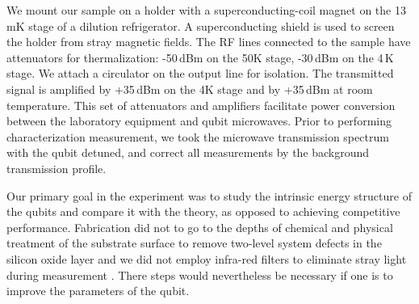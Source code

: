 


We mount our sample on a holder with a superconducting-coil magnet on the 13\,mK
stage of  a dilution refrigerator.  A  superconducting shield is used  to screen
the holder  from stray magnetic  fields.  The RF  lines connected to  the sample
have attenuators for thermalization: -50\,dBm on  the 50K stage, -30\,dBm on the
4\,K  stage.  We  attach a  circulator on  the output  line for  isolation.  The
transmitted signal is amplified  by +35\,dBm on the 4K stage  and by +35\,dBm at
room  temperature.  This  set  of attenuators  and  amplifiers facilitate  power
conversion  between the  laboratory equipment  and qubit  microwaves.  Prior  to
performing  characterization measurement,  we  took  the microwave  transmission
spectrum with the qubit detuned, and  correct all measurements by the background
transmission profile.

Our primary goal  in the experiment was to study  the intrinsic energy structure
of  the  qubits  and  compare  it  with the  theory,  as  opposed  to  achieving
competitive performance. Fabrication did not to go to the depths of chemical and
physical treatment of  the substrate surface to remove  two-level system defects
in the  silicon oxide layer \cite{earnest2018}  and we did not  employ infra-red
filters to  eliminate stray  light during measurement  \cite{barends2011}. There
steps would nevertheless be necessary if one is to improve the parameters of the
qubit.

